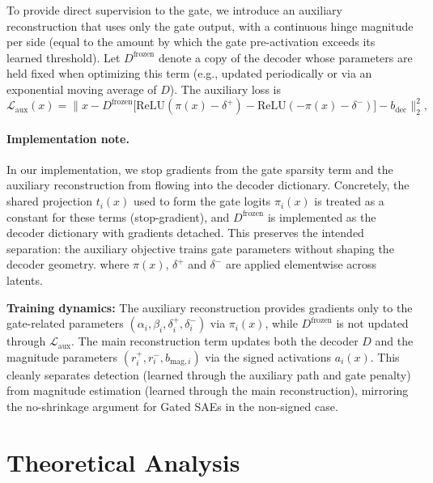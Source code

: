 \documentclass{article}
\begin{document}
To provide direct supervision to the gate, we introduce an auxiliary reconstruction that uses only the gate output, with a continuous hinge magnitude per side (equal to the amount by which the gate pre-activation exceeds its learned threshold). Let $D^{\text{frozen}}$ denote a copy of the decoder whose parameters are held fixed when optimizing this term (e.g., updated periodically or via an exponential moving average of $D$). The auxiliary loss is
\begin{equation}
    \mathcal{L}_{\text{aux}}(x) = \big\|x - D^{\text{frozen}} \big[ \text{ReLU}(\pi(x) - \delta^+) - \text{ReLU}(-\pi(x) - \delta^-) \big] - b_{\text{dec}}\big\|_2^2,
\end{equation}

\paragraph{Implementation note.}
In our implementation, we stop gradients from the gate sparsity term and the auxiliary reconstruction from flowing into the decoder dictionary. Concretely, the shared projection $t_i(x)$ used to form the gate logits $\pi_i(x)$ is treated as a constant for these terms (stop-gradient), and $D^{\text{frozen}}$ is implemented as the decoder dictionary with gradients detached. This preserves the intended separation: the auxiliary objective trains gate parameters without shaping the decoder geometry.
where $\pi(x)$, $\delta^+$ and $\delta^-$ are applied elementwise across latents.

\textbf{Training dynamics:} The auxiliary reconstruction provides gradients only to the gate-related parameters $(\alpha_i, \beta_i, \delta_i^+, \delta_i^-)$ via $\pi_i(x)$, while $D^{\text{frozen}}$ is not updated through $\mathcal{L}_{\text{aux}}$. The main reconstruction term updates both the decoder $D$ and the magnitude parameters $(r_i^+, r_i^-, b_{\text{mag},i})$ via the signed activations $a_i(x)$. This cleanly separates detection (learned through the auxiliary path and gate penalty) from magnitude estimation (learned through the main reconstruction), mirroring the no-shrinkage argument for Gated SAEs in the non-signed case.


\section{Theoretical Analysis}
\end{document}
